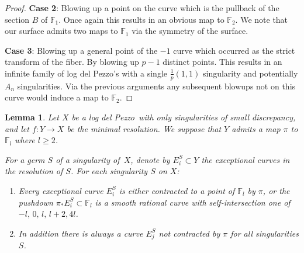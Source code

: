 \documentclass[12pt]{amsbook}
\theoremstyle{plain}
\newtheorem{lem}[thm]{Lemma}
\newcommand{\ldp}{log del Pezzo}
\newcommand{\mb}[1]{\mathbb{#1}}
\newcommand{\minres}{minimal resolution}
\newcommand{\F}{\mathbb{F}}
\begin{document}
\begin{proof}
\textbf{Case 2}: Blowing up a point on the curve which is the pullback of the section $B$ of $\mb{F}_1$. Once again this results in an obvious map to $\mb{F}_2$. We note that our surface admits two maps to $\mb{F}_1$ via the symmetry of the surface.


\textbf{Case 3}:
Blowing up a general point of the $-1 $ curve which occurred as the strict transform of the fiber. By blowing up $p-1$ distinct points. This results in an infinite family of \ldp's with a single $\frac{1}{p}(1,1)$ singularity and potentially $A_n$ singularities.
Via the previous arguments any subsequent blowups not on this curve would induce a map to $\mb{F}_2$.
\end{proof}


\begin{lem}\label{HSlem}
Let $X$ be a \ldp\ with only singularities of small discrepancy, and
let $f \colon Y \rightarrow X$ be the \minres. We suppose that $Y$ admits a map $\pi$ to $\mb{F}_l$ where $l \geq 2$.

For a germ $S$ of a singularity of~$X$, denote by
$E_i^S \subset Y$ the exceptional curves in the resolution of $S$.
For each singularity $S$ on $X$:
\begin{enumerate}
\item
Every exceptional curve $E_i^S$ is either contracted to a point of $\mb{F}_l$ by $\pi$,
or the pushdown
$\pi_* E_i^S\subset\F_l$ is a smooth rational curve with self-intersection one of $-l, \,0, \, l, \, l+2, 4l $.
\item
In addition there is always a curve $E_j^S$ not contracted by $\pi$ for all singularities $S$.
\end{enumerate}

\end{lem}
\end{document}
